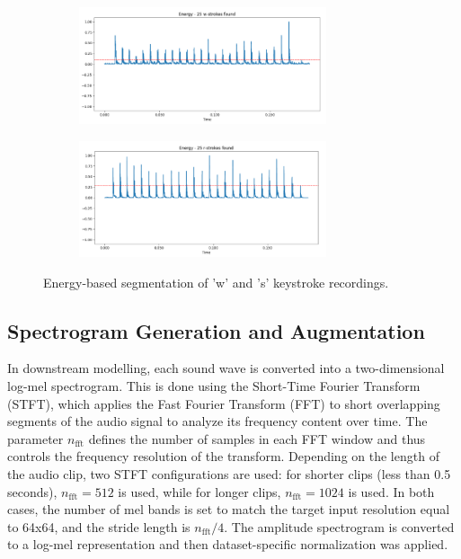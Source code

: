 \documentclass[a4paper,11pt,twoside]{report}
\theoremstyle{definition}
\begin{document}
\begin{figure}[h!]
  \centering
  \begin{subfigure}[b]{\textwidth}
    \centering
    \includegraphics[width=0.8\textwidth]{img_methodology/segmentation_1.png}
    \label{fig:segmentation_example}
  \end{subfigure}
  \hfill
  \begin{subfigure}[b]{\textwidth}
    \centering
    \includegraphics[width=0.8\textwidth]{img_methodology/segmentation_2.png}
    \label{fig:segmentation_example2}
  \end{subfigure}
  \caption{Energy-based segmentation of 'w' and 's' keystroke recordings.}
  \label{fig:energy_segmentation}
\end{figure}

\subsection{Spectrogram Generation and Augmentation}

In downstream modelling, each sound wave is converted into a two-dimensional log-mel spectrogram. This is done using the Short-Time Fourier Transform (STFT), which applies the Fast Fourier Transform (FFT) to short overlapping segments of the audio signal to analyze its frequency content over time. The parameter \( n_{\text{fft}} \) defines the number of samples in each FFT window and thus controls the frequency resolution of the transform. Depending on the length of the audio clip, two STFT configurations are used: for shorter clips (less than 0.5 seconds), $n_{\text{fft}} = 512 $ is used, while for longer clips, $ n_{\text{fft}} = 1024 $ is used. In both cases, the number of mel bands is set to match the target input resolution equal to 64x64, and the stride length is $n_{\text{fft}} / 4$. The amplitude spectrogram is converted to a log-mel representation and then dataset-specific normalization was applied.
\end{document}

